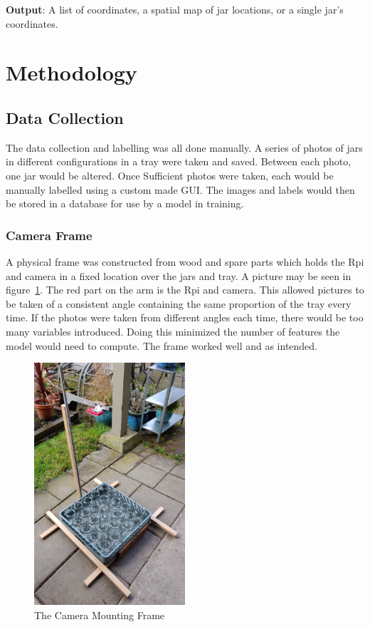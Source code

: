 \documentclass[11pt]{article}
\begin{document}
            \textbf{Output}: A list of coordinates, a spatial map of jar locations, or a single jar's coordinates. %

    \FloatBarrier
    \section{Methodology}
        \subsection{Data Collection}
            The data collection and labelling was all done manually. A series of photos of jars in different configurations in a tray were taken and saved. Between each photo, one jar would be altered. Once Sufficient photos were taken, each would be manually labelled using a custom made GUI. The images and labels would then be stored in a database for use by a model in training.

            \subsubsection{Camera Frame}
                A physical frame was constructed from wood and spare parts which holds the Rpi and camera in a fixed location over the jars and tray. A picture may be seen in figure~\ref{fig:frame}. The red part on the arm is the Rpi and camera. This allowed pictures to be taken of a consistent angle containing the same proportion of the tray every time. If the photos were taken from different angles each time, there would be too many variables introduced. Doing this minimized the number of features the model would need to compute. The frame worked well and as intended.

                \begin{figure}[ht]
                    \centering
                    \includegraphics[height=9cm]{images/frame.jpg}      %
                    \caption{The Camera Mounting Frame}\label{fig:frame}
                \end{figure}
\end{document}
